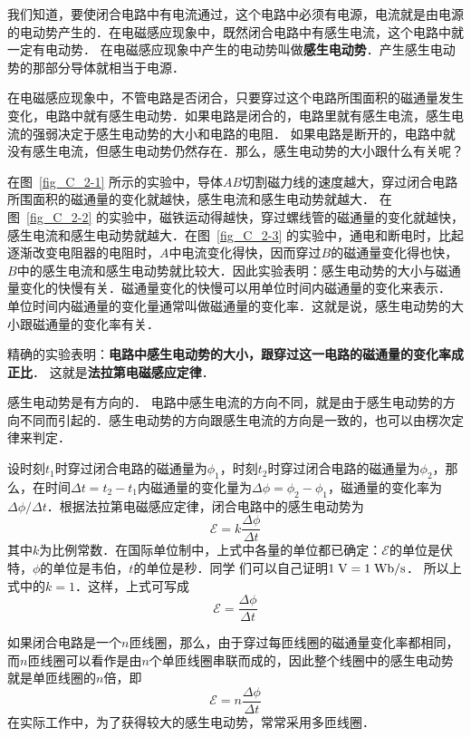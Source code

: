 我们知道，要使闭合电路中有电流通过，这个电路中必须有电源，电流就是由电源的电动势产生的．在电磁感应现象中，既然闭合电路中有感生电流，这个电路中就一定有电动势．
在电磁感应现象中产生的电动势叫做\textbf{感生电动势}．产生感生电动势的那部分导体就相当于电源．

在电磁感应现象中，不管电路是否闭合，只要穿过这个电路所围面积的磁通量发生变化，电路中就有感生电动势．如果电路是闭合的，电路里就有感生电流，感生电流的强弱决定于感生电动势的大小和电路的电阻．
如果电路是断开的，电路中就没有感生电流，但感生电动势仍然存在．那么，感生电动势的大小跟什么有关呢？

在图~\ref{fig_C_2-1} 所示的实验中，导体$AB$切割磁力线的速度越大，穿过闭合电路所围面积的磁通量的变化就越快，感生电流和感生电动势就越大．
在图~\ref{fig_C_2-2} 的实验中，磁铁运动得越快，穿过螺线管的磁通量的变化就越快，感生电流和感生电动势就越大．在图~\ref{fig_C_2-3} 的实验中，通电和断电时，比起逐渐改变电阻器的电阻时，$A$中电流变化得快，因而穿过$B$的磁通量变化得也快，$B$中的感生电流和感生电动势就比较大．因此实验表明：感生电动势的大小与磁通量变化的快慢有关．磁通量变化的快慢可以用单位时间内磁通量的变化来表示．
单位时间内磁通量的变化量通常叫做磁通量的变化率．这就是说，感生电动势的大小跟磁通量的变化率有关．

精确的实验表明：\textbf{电路中感生电动势的大小，跟穿过这一电路的磁通量的变化率成正比}．
这就是\textbf{法拉第电磁感应定律}．

感生电动势是有方向的．
电路中感生电流的方向不同，就是由于感生电动势的方向不同而引起的．感生电动势的方向跟感生电流的方向是一致的，也可以由楞次定律来判定．

设时刻$t_1$时穿过闭合电路的磁通量为$\phi_1$，时刻$t_2$时穿过闭合电路的磁通量为$\phi_2$，那么，在时间$\Delta t=t_2-t_1$内磁通量的变化量为$\Delta \phi=\phi_2-\phi_1$，磁通量的变化率为$\Delta \phi/\Delta t$．根据法拉第电磁感应定律，闭合电路中的感生电动势为
\[\mathcal{E}=k\frac{\Delta \phi}{\Delta t}\]
其中$k$为比例常数．在国际单位制中，上式中各量的单位都已确定：$\mathcal{E}$的单位是伏特，$\phi$的单位是韦伯，$t$的单位是秒．同学
们可以自己证明$1 \;\text{V}=1 \;\text{Wb}/\text{s}  $．
所以上式中的$k=1$．这样，上式可写成
\begin{equation}\label{eq_C_2-1}
    \mathcal{E}=\frac{\Delta \phi}{\Delta t}
\end{equation}

如果闭合电路是一个$n$匝线圈，那么，由于穿过每匝线圈的磁通量变化率都相同，而$n$匝线圈可以看作是由$n$个单匝线圈串联而成的，因此整个线圈中的感生电动势就是单匝线圈的$n$倍，即
\begin{equation}\label{eq_C_2-2}
    \mathcal{E}=n\frac{\Delta \phi}{\Delta t}
\end{equation}
在实际工作中，为了获得较大的感生电动势，常常采用多匝线圈．


